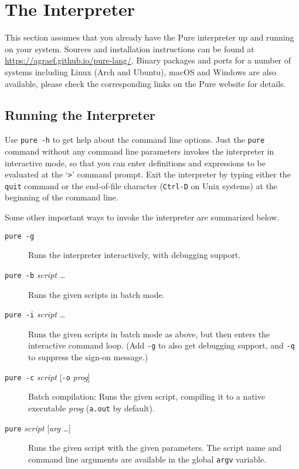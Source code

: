 \documentclass[a4paper,12pt]{article}
\newcommand{\nt}[1]{\textrm{\textit{#1\/}}}
\begin{document}
\section{The Interpreter}
\label{Interpreter}

This section assumes that you already have the Pure interpreter up and running on your system. Sources and installation instructions can be found at \url{https://agraef.github.io/pure-lang/}. Binary packages and ports for a number of systems including Linux (Arch and Ubuntu), macOS and Windows are also available, please check the corresponding links on the Pure website for details.

\subsection{Running the Interpreter}

Use \verb|pure -h| to get help about the command line options. Just the \verb|pure| command without any command line parameters invokes the interpreter in interactive mode, so that you can enter definitions and expressions to be evaluated at the `\verb|>|' command prompt. Exit the interpreter by typing either the \verb|quit| command or the end-of-file character (\verb|Ctrl-D| on Unix systems) at the beginning of the command line.

Some other important ways to invoke the interpreter are summarized below.

\begin{description}
\item[\rm\texttt{pure -g}] Runs the interpreter interactively, with debugging support.
\item[\rm\texttt{pure -b} \nt{script} \ldots] Runs the given scripts in batch mode.
\item[\rm\texttt{pure -i} \nt{script} \ldots] Runs the given scripts in batch mode as above, but then enters the interactive command loop. (Add \texttt{-g} to also get debugging support, and \texttt{-q} to suppress the sign-on message.)
\item[\rm\texttt{pure -c} \nt{script} {[\texttt{-o} \nt{prog}]}] Batch compilation: Runs the given script, compiling it to a native executable \nt{prog} (\texttt{a.out} by default).
\item[\rm\texttt{pure} \nt{script} {[\nt{arg} \ldots]}] Runs the given script with the given parameters. The script name and command line arguments are available in the global \verb|argv| variable.
\end{description}
\end{document}

